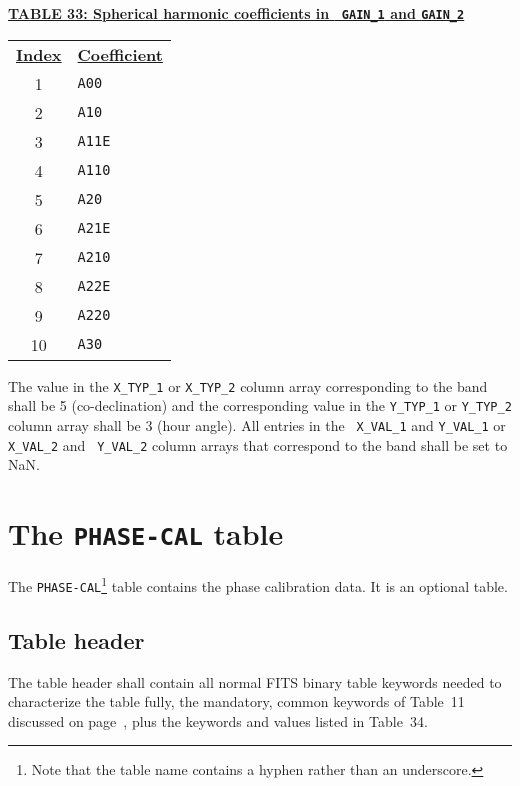 \documentclass[twoside]{article}
\newcommand{\Hi}[1]{\textcolor{hicol}{#1}}
\begin{document}
\begin{center}
\underline{\bf{TABLE 33: Spherical harmonic coefficients in {\tt
      GAIN\_1} and {\tt GAIN\_2}}}\\
\begin{tabular}{cl}
\noalign{\vspace{2pt}}
\underline{{\bf Index\vphantom{y}}} & \underline{\bf{Coefficient\vphantom{y}}} \\
\noalign{\vspace{2pt}}
 1 & {\tt A00} \\
 2 & {\tt A10} \\
 3 & {\tt A11E} \\
 4 & {\tt A110} \\
 5 & {\tt A20} \\
 6 & {\tt A21E} \\
 7 & {\tt A210} \\
 8 & {\tt A22E} \\
 9 & {\tt A220} \\
 10 & {\tt A30}
\end{tabular}
\end{center}

The value in the {\tt X\_TYP\_1} or {\tt X\_TYP\_2} \Hi{column array}
corresponding to the band shall be 5 (co-declination) and the
corresponding value in the {\tt Y\_TYP\_1} or {\tt Y\_TYP\_2}
\Hi{column array} shall be 3 (hour angle).  All entries in the {\tt
  X\_VAL\_1} and {\tt Y\_VAL\_1} or  {\tt X\_VAL\_2} and {\tt
  Y\_VAL\_2} \Hi{column arrays} that correspond to the band shall be
set to NaN.

\section{The {\tt PHASE-CAL} table}
\label{s:PC}

The {\tt PHASE-CAL}\footnote{Note that the table name contains a
  hyphen rather than an underscore.} table contains the phase
calibration data.  It is an optional table.

\subsection{Table header}

\Hi{The table header shall contain all normal FITS binary table
keywords needed to characterize the table fully, the mandatory, common
keywords of Table~11 discussed on page~\pageref{ta:keywords}, plus the
keywords and values listed in Table~\Hi{34}.}
\end{document}
